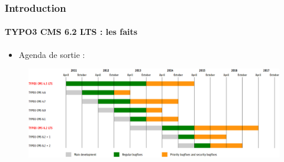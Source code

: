 
\begin{frame}[fragile]
	\frametitle{Introduction}
	\framesubtitle{TYPO3 CMS 6.2 LTS : les faits}

	\begin{itemize}
		\item Agenda de sortie :
	\end{itemize}

	\begin{figure}
		\includegraphics[width=0.99\linewidth]{Images/Introduction/ReleaseAgenda.png}
	\end{figure}

\end{frame}


